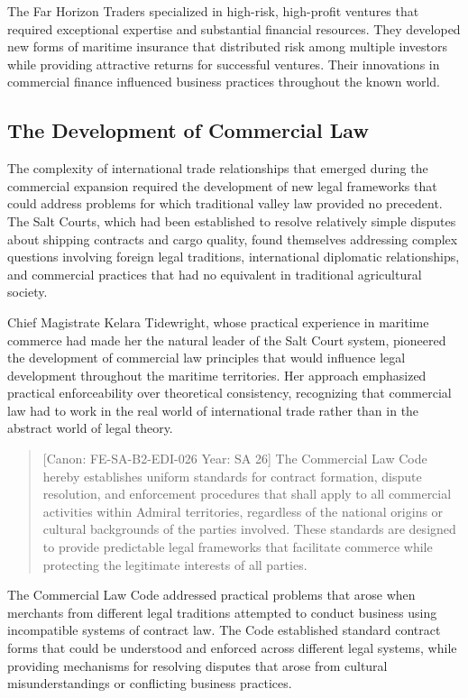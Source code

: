 The Far Horizon Traders specialized in high-risk, high-profit ventures
that required exceptional expertise and substantial financial resources.
They developed new forms of maritime insurance that distributed risk
among multiple investors while providing attractive returns for
successful ventures. Their innovations in commercial finance influenced
business practices throughout the known world.

\subsection{The Development of Commercial
Law}\label{the-development-of-commercial-law}

The complexity of international trade relationships that emerged during
the commercial expansion required the development of new legal
frameworks that could address problems for which traditional valley law
provided no precedent. The Salt Courts, which had been established to
resolve relatively simple disputes about shipping contracts and cargo
quality, found themselves addressing complex questions involving foreign
legal traditions, international diplomatic relationships, and commercial
practices that had no equivalent in traditional agricultural society.

Chief Magistrate Kelara Tidewright, whose practical experience in
maritime commerce had made her the natural leader of the Salt Court
system, pioneered the development of commercial law principles that
would influence legal development throughout the maritime territories.
Her approach emphasized practical enforceability over theoretical
consistency, recognizing that commercial law had to work in the real
world of international trade rather than in the abstract world of legal
theory.

\begin{quote}
{[}Canon: FE-SA-B2-EDI-026 \textbar{} Year: SA 26{]} The Commercial Law
Code hereby establishes uniform standards for contract formation,
dispute resolution, and enforcement procedures that shall apply to all
commercial activities within Admiral territories, regardless of the
national origins or cultural backgrounds of the parties involved. These
standards are designed to provide predictable legal frameworks that
facilitate commerce while protecting the legitimate interests of all
parties.
\end{quote}

The Commercial Law Code addressed practical problems that arose when
merchants from different legal traditions attempted to conduct business
using incompatible systems of contract law. The Code established
standard contract forms that could be understood and enforced across
different legal systems, while providing mechanisms for resolving
disputes that arose from cultural misunderstandings or conflicting
business practices.

